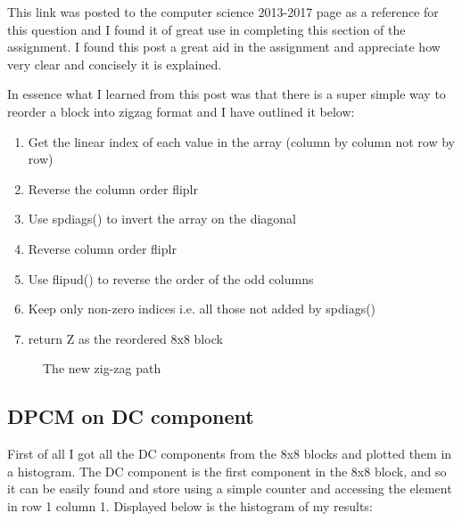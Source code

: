 \documentclass[]{assignment}
\begin{document}
This link was posted to the computer science 2013-2017 page as a reference for this question and I found it of great use in completing this section of the assignment. I found this post a great aid in the assignment and appreciate how very clear and concisely it is explained.

In essence what I learned from this post was that there is a super simple way to reorder a block into zigzag format and I have outlined it below:

\begin{enumerate}
  \item Get the linear index of each value in the array (column by column not row by row)
  \item Reverse the column order fliplr
  \item Use spdiags() to invert the array on the diagonal
  \item Reverse column order fliplr
  \item Use flipud() to reverse the order of the odd columns
  \item Keep only non-zero indices i.e. all those not added by spdiags()
  \item return Z as the reordered 8x8 block
\end{enumerate}

\begin{figure}[h]
\centering
\fboxsep 0mm
\caption{\label{fig:zigzag} The new zig-zag path}
\end{figure} 

\clearpage

\subsection{DPCM on DC component} 

First of all I got all the DC components from the 8x8 blocks and plotted them in a histogram. The DC component is the first component in the 8x8 block, and so it can be easily found and store using a simple counter and accessing the element in row 1 column 1. Displayed below is the histogram of my results:
\end{document}
